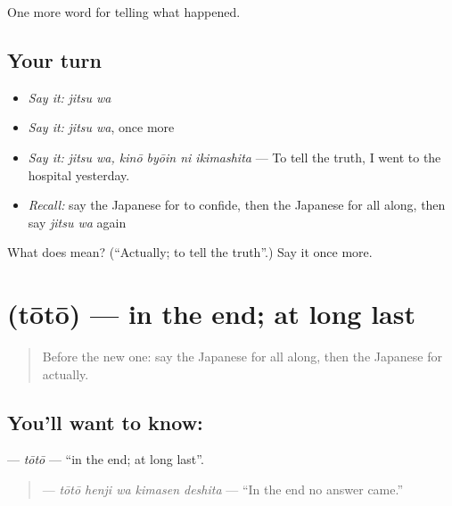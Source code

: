 \begin{grammarlens}[title={What you've built}]
One more word for telling what happened.
\end{grammarlens}

\subsection*{Your turn}
\begin{itemize}
\raggedright
  \item \emph{Say it:} \emph{jitsu wa}
  \item \emph{Say it:} \emph{jitsu wa}, once more
  \item \emph{Say it:} \emph{jitsu wa, kinō byōin ni ikimashita} — To tell the truth, I went to the hospital yesterday.
  \item \emph{Recall:} say the Japanese for to confide, then the Japanese for all along, then say \emph{jitsu wa} again
\end{itemize}

\begin{tcolorbox}[breakable,colback=teal!4,colframe=teal!35!black,title={Before you move on}]
What does  mean? (\textquotedblleft{}Actually; to tell the truth\textquotedblright{}.) Say it once more.
\end{tcolorbox}
\section[\texorpdfstring{\ja{とうとう} (tōtō)}{とうとう (tōtō)}]{ (tōtō) — in the end; at long last}

\label{lesson:JA-C310-toutou}



\begin{quote}
Before the new one: say the Japanese for all along, then the Japanese for actually.
\end{quote}

\subsection*{You'll want to know: }
\textbf{} — \emph{tōtō} — \textquotedblleft{}in the end; at long last\textquotedblright{}.

\begin{quote}
\textbf{  } — \emph{tōtō henji wa kimasen deshita} — \textquotedblleft{}In the end no answer came.\textquotedblright{}
\end{quote}

